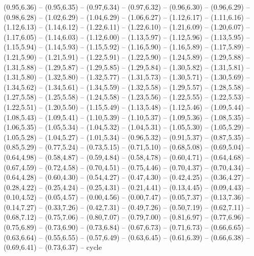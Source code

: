 \expandafter\def\csname geo:gebiet:BEL\endcsname{
  (0.95,6.36) -- (0.95,6.35) -- (0.97,6.34) -- (0.97,6.32) -- (0.96,6.30) -- (0.96,6.29) -- (0.98,6.28) -- (1.02,6.29) -- (1.04,6.29) -- (1.06,6.27) -- (1.12,6.17) -- (1.11,6.16) -- (1.12,6.13) -- (1.14,6.12) -- (1.22,6.11) -- (1.22,6.10) -- (1.21,6.09) -- (1.20,6.07) -- (1.17,6.05) -- (1.14,6.03) -- (1.12,6.00) -- (1.13,5.97) -- (1.12,5.96) -- (1.13,5.95) -- (1.15,5.94) -- (1.14,5.93) -- (1.15,5.92) -- (1.16,5.90) -- (1.16,5.89) -- (1.17,5.89) -- (1.21,5.90) -- (1.21,5.91) -- (1.22,5.91) -- (1.22,5.90) -- (1.24,5.89) -- (1.29,5.88) -- (1.31,5.88) -- (1.29,5.87) -- (1.29,5.85) -- (1.29,5.84) -- (1.30,5.82) -- (1.31,5.81) -- (1.31,5.80) -- (1.32,5.80) -- (1.32,5.77) -- (1.31,5.73) -- (1.30,5.71) -- (1.30,5.69) -- (1.34,5.62) -- (1.34,5.61) -- (1.34,5.59) -- (1.32,5.58) -- (1.29,5.57) -- (1.28,5.58) -- (1.27,5.58) -- (1.25,5.58) -- (1.24,5.58) -- (1.23,5.56) -- (1.22,5.55) -- (1.22,5.53) -- (1.22,5.51) -- (1.20,5.50) -- (1.15,5.49) -- (1.13,5.48) -- (1.12,5.46) -- (1.09,5.44) -- (1.08,5.43) -- (1.09,5.41) -- (1.10,5.39) -- (1.10,5.37) -- (1.09,5.36) -- (1.08,5.35) -- (1.06,5.35) -- (1.05,5.34) -- (1.04,5.32) -- (1.04,5.31) -- (1.05,5.30) -- (1.05,5.29) -- (1.05,5.28) -- (1.04,5.27) -- (1.01,5.34) -- (0.96,5.32) -- (0.91,5.37) -- (0.87,5.35) -- (0.85,5.29) -- (0.77,5.24) -- (0.73,5.15) -- (0.71,5.10) -- (0.68,5.08) -- (0.69,5.04) -- (0.64,4.98) -- (0.58,4.87) -- (0.59,4.84) -- (0.58,4.78) -- (0.60,4.71) -- (0.64,4.68) -- (0.67,4.59) -- (0.72,4.58) -- (0.70,4.51) -- (0.75,4.46) -- (0.70,4.37) -- (0.70,4.34) -- (0.64,4.28) -- (0.60,4.30) -- (0.54,4.27) -- (0.47,4.30) -- (0.42,4.25) -- (0.36,4.27) -- (0.28,4.22) -- (0.25,4.24) -- (0.25,4.31) -- (0.21,4.41) -- (0.13,4.45) -- (0.09,4.43) -- (0.10,4.52) -- (0.05,4.57) -- (0.00,4.56) -- (0.00,7.47) -- (0.05,7.37) -- (0.13,7.36) -- (0.14,7.27) -- (0.33,7.26) -- (0.42,7.31) -- (0.49,7.26) -- (0.50,7.19) -- (0.62,7.11) -- (0.68,7.12) -- (0.75,7.06) -- (0.80,7.07) -- (0.79,7.00) -- (0.81,6.97) -- (0.77,6.96) -- (0.75,6.89) -- (0.73,6.90) -- (0.73,6.84) -- (0.67,6.73) -- (0.71,6.73) -- (0.66,6.65) -- (0.63,6.64) -- (0.55,6.55) -- (0.57,6.49) -- (0.63,6.45) -- (0.61,6.39) -- (0.66,6.38) -- (0.69,6.41) -- (0.73,6.37) -- cycle}

